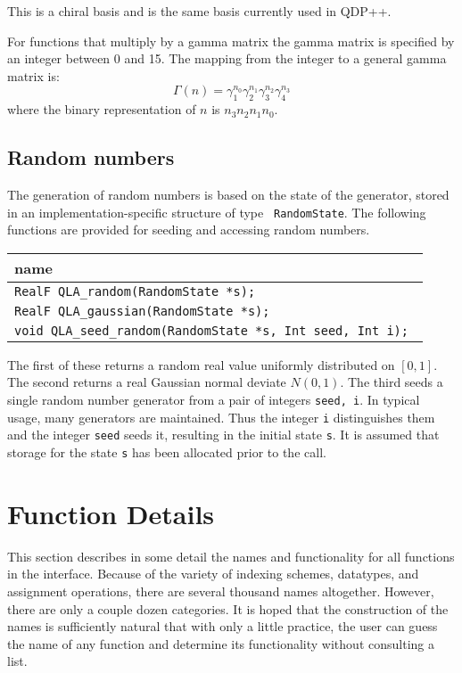 \documentclass{article}
\begin{document}
This is a chiral basis and is the same basis currently used in QDP++.

For functions that multiply by a gamma matrix the gamma matrix is
specified by an integer between 0 and 15.  The mapping from the integer
to a general gamma matrix is:
 \[
\Gamma(n) = \gamma_1^{n_0} \gamma_2^{n_1} \gamma_3^{n_2} \gamma_4^{n_3}
\]
where the binary representation of $n$ is $n_3 n_2 n_1 n_0$.


\subsection{Random numbers}

The generation of random numbers is based on the state of the
generator, stored in an implementation-specific structure of type {\tt
RandomState}.  The following functions are provided for seeding and
accessing random numbers.

\begin{center}
\begin{tabular}{|l|}
\hline
  name               \\
\hline
\verb|RealF QLA_random(RandomState *s);            | \\
\verb|RealF QLA_gaussian(RandomState *s);          | \\
\verb|void QLA_seed_random(RandomState *s, Int seed, Int i); | \\
\hline
\end{tabular}
\end{center}

The first of these returns a random real value uniformly distributed
on $[0,1]$.  The second returns a real Gaussian normal deviate
$N(0,1)$.  The third seeds a single random number generator from a
pair of integers {\tt seed, i}.  In typical usage, many generators are
maintained.  Thus the integer {\tt i} distinguishes them and the
integer {\tt seed} seeds it, resulting in the initial state {\tt s}.
It is assumed that storage for the state {\tt s} has been allocated
prior to the call.


\section{Function Details}
\label{sec:details}

This section describes in some detail the names and functionality for
all functions in the interface.  Because of the variety of indexing
schemes, datatypes, and assignment operations, there are several
thousand names altogether.  However, there are only a couple dozen
categories.  It is hoped that the construction of the names is
sufficiently natural that with only a little practice, the user can
guess the name of any function and determine its functionality without
consulting a list.
\end{document}
